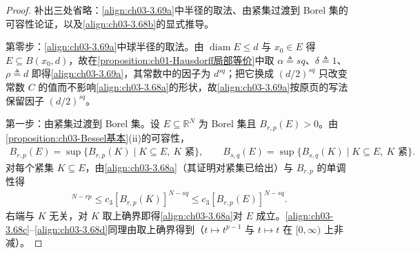 \documentclass[../../main.tex]{subfiles}%
\begin{document}
\begin{proof}
补出三处省略：\eqref{align:ch03-3.69a}中半径的取法、由紧集过渡到 Borel 集的可容性论证，以及\eqref{align:ch03-3.68b}的显式推导。

第零步：\eqref{align:ch03-3.69a}中球半径的取法。由 $\operatorname{diam}E\leqslant d$ 与 $x_0\in E$ 得 $E\subseteq B(x_0,d)$，故在\cref{proposition:ch01-Hausdorff局部等价}中取 $\alpha\triangleq sq$、$\delta\triangleq1$、$\rho\triangleq d$ 即得\eqref{align:ch03-3.69a}，其常数中的因子为 $d^{sq}$；把它换成 $(d/2)^{sq}$ 只改变常数 $C$ 的值而不影响\eqref{align:ch03-3.68a}的形状，故\eqref{align:ch03-3.69a}按原页的写法保留因子 $(d/2)^{sq}$。

第一步：由紧集过渡到 Borel 集。设 $E\subseteq\mathbb{R}^N$ 为 Borel 集且 $B_{r,p}(E)>0$。由\cref{proposition:ch03-Bessel基本}(ii)的可容性，
\begin{align*}
B_{r,p}(E)=\sup\{B_{r,p}(K)\mid K\subseteq E,\ K\text{ 紧}\},\qquad
B_{s,q}(E)=\sup\{B_{s,q}(K)\mid K\subseteq E,\ K\text{ 紧}\}.
\end{align*}
对每个紧集 $K\subseteq E$，由\eqref{align:ch03-3.68a}（其证明对紧集已给出）与 $B_{r,p}$ 的单调性得
\begin{align*}
[B_{s,q}(K)]^{N-rp}\leqslant c_3[B_{r,p}(K)]^{N-sq}\leqslant c_3[B_{r,p}(E)]^{N-sq}.
\end{align*}
右端与 $K$ 无关，对 $K$ 取上确界即得\eqref{align:ch03-3.68a}对 $E$ 成立。\eqref{align:ch03-3.68c}--\eqref{align:ch03-3.68d}同理由取上确界得到（$t\mapsto t^{p-1}$ 与 $t\mapsto t$ 在 $[0,\infty)$ 上非减）。


\end{proof}
\end{document}

